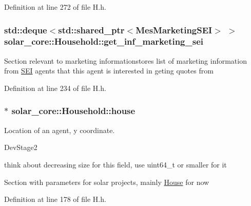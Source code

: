 Definition at line 272 of file H.\+h.

\hypertarget{classsolar__core_1_1_household_a3ae4cec5fca43ee5ca3287a01f5a05a2}{}
\subsubsection[{get\+\_\+inf\+\_\+marketing\+\_\+sei}]{\setlength{\rightskip}{0pt plus 5cm}std\+::deque$<$std\+::shared\+\_\+ptr$<${\bf Mes\+Marketing\+S\+E\+I}$>$ $>$ solar\+\_\+core\+::\+Household\+::get\+\_\+inf\+\_\+marketing\+\_\+sei\hspace{0.3cm}{\ttfamily [protected]}}\label{classsolar__core_1_1_household_a3ae4cec5fca43ee5ca3287a01f5a05a2}
Section relevant to marketing informationstores list of marketing information from \hyperlink{classsolar__core_1_1_s_e_i}{S\+E\+I} agents that this agent is interested in geting quotes from 

Definition at line 234 of file H.\+h.

\hypertarget{classsolar__core_1_1_household_a1104d8264fe733937e1fd2e9ad0f8fc1}{}
\subsubsection[{house}]{$\ast$ solar\+\_\+core\+::\+Household\+::house}\label{classsolar__core_1_1_household_a1104d8264fe733937e1fd2e9ad0f8fc1}
Location of an agent, y coordinate.\begin{DoxyRefDesc}{Dev\+Stage2}
\item[\hyperlink{_dev_stage2__DevStage2000012}{Dev\+Stage2}]think about decreasing size for this field, use uint64\+\_\+t or smaller for it \end{DoxyRefDesc}


Section with parameters for solar projects, mainly \hyperlink{classsolar__core_1_1_house}{House} for now 

Definition at line 178 of file H.\+h.

\hypertarget{classsolar__core_1_1_household_a077c668f06c009a43c535f1ad92cf92e}{}
